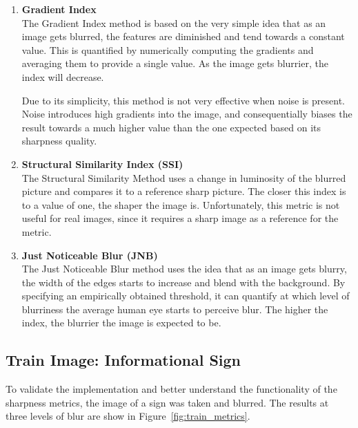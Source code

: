 \begin{enumerate}
\item {\bf Gradient Index} \\
The Gradient Index method is based on the very simple idea that as an image gets blurred, the features are diminished and tend towards a constant value. This is quantified by numerically computing the gradients and averaging them to provide a single value. As the image gets blurrier, the index will decrease. 

Due to its simplicity, this method is not very effective when noise is present. Noise introduces high gradients into the image, and consequentially biases the result towards a much higher value than the one expected based on its sharpness quality.  

\item {\bf Structural Similarity Index (SSI)} \\
The Structural Similarity Method uses a change in luminosity of the blurred picture and compares it to a reference sharp picture. The closer this index is to a value of one, the shaper the image is. Unfortunately, this metric is not useful for real images, since it requires a sharp image as a reference for the metric.

\item {\bf Just Noticeable Blur (JNB)~\cite{Ferzli:2009}} \\
The Just Noticeable Blur method uses the idea that as an image gets blurry, the width of the edges starts to increase and blend with the background. By specifying an empirically obtained threshold, it can quantify at which level of blurriness the average human eye starts to perceive blur. The higher the index, the blurrier the image is expected to be.
\end{enumerate}
\subsection{Train Image: Informational Sign}
To validate the implementation and better understand the functionality of the sharpness metrics, the image of a sign was taken and blurred. The results at three levels of blur are show in Figure~\ref{fig:train_metrics}.

